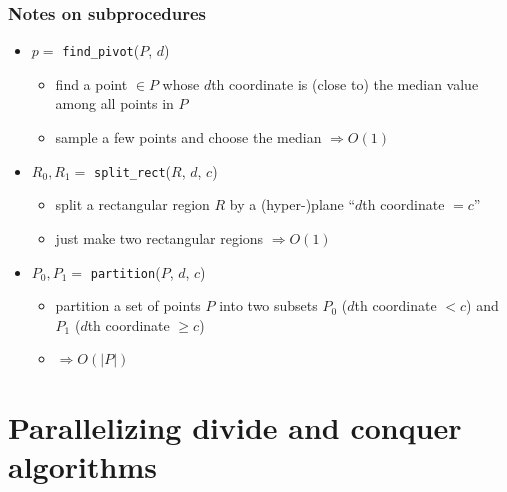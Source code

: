 \documentclass[12pt,dvipdfmx]{beamer}
\newcommand{\mura}[1]{{\color{purple}#1}}
\newcommand{\ao}[1]{{\color{blue}#1}}
\begin{document}
\begin{frame}[fragile]
\frametitle{Notes on subprocedures}

\begin{itemize}
\item $p = $ \mura{\tt find\_pivot}($P$, $d$)
  \begin{itemize}
  \item find a point $\in P$ whose $d$th coordinate
    is (close to) the median value among all points in $P$
  \item sample a few points and choose the median 
    \ao{$\Rightarrow O(1)$}
  \end{itemize}

\item $R_0,R_1 = $ \mura{\tt split\_rect}($R$, $d$, $c$)
  \begin{itemize}
  \item split a rectangular region $R$ by a (hyper-)plane
    ``$d$th coordinate $= c$''
  \item just make two rectangular regions 
    \ao{$\Rightarrow O(1)$}
  \end{itemize}

\item $P_0,P_1 = $ \mura{\tt partition}($P$, $d$, $c$)
  \begin{itemize}
  \item partition a set of points $P$ into two subsets $P_0$
    ($d$th coordinate $< c$) and $P_1$ ($d$th coordinate $\geq c$)
  \item \ao{$\Rightarrow O(|P|)$}
  \end{itemize}
\end{itemize}
\end{frame}


\section{Parallelizing divide and conquer algorithms}
\end{document}
